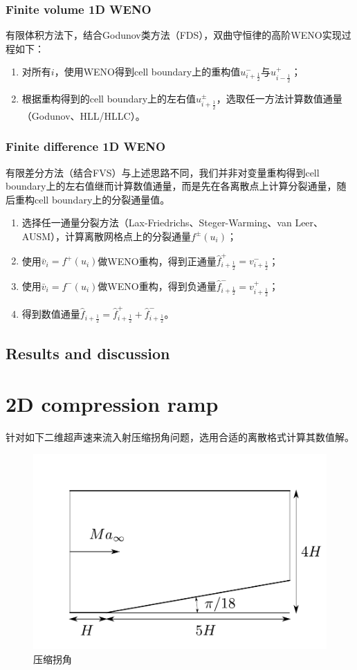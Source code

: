 \documentclass[11pt]{article}
\begin{document}
\subsubsection{Finite volume 1D WENO}
有限体积方法下，结合Godunov类方法（FDS），双曲守恒律的高阶WENO实现过程如下：
\begin{enumerate}
	\item 对所有$i$，使用WENO得到cell boundary上的重构值$u_{i+\frac{1}{2}}^-$与$u_{i-\frac{1}{2}}^+$；
	\item 根据重构得到的cell boundary上的左右值$u_{i+\frac{1}{2}}^\pm$，选取任一方法计算数值通量（Godunov、HLL/HLLC）。
\end{enumerate}

\subsubsection{Finite difference 1D WENO}
有限差分方法（结合FVS）与上述思路不同，我们并非对变量重构得到cell boundary上的左右值继而计算数值通量，而是先在各离散点上计算分裂通量，随后重构cell boundary上的分裂通量值。
\begin{enumerate}
	\item 选择任一通量分裂方法（Lax-Friedrichs、Steger-Warming、van Leer、AUSM），计算离散网格点上的分裂通量$f^\pm(u_i)$；
	\item 使用$\bar{v}_i=f^+(u_i)$做WENO重构，得到正通量$\hat{f}^+_{i+\frac{1}{2}}=v^-_{i+\frac{1}{2}}$；
	\item 使用$\bar{v}_i=f^-(u_i)$做WENO重构，得到负通量$\hat{f}^-_{i+\frac{1}{2}}=v^+_{i+\frac{1}{2}}$；
	\item 得到数值通量$\hat{f}_{i+\frac{1}{2}}=\hat{f}^+_{i+\frac{1}{2}}+\hat{f}^-_{i+\frac{1}{2}}$。
\end{enumerate}

\subsection{Results and discussion}

\newpage
\section{2D compression ramp}
针对如下二维超声速来流入射压缩拐角问题，选用合适的离散格式计算其数值解。
\begin{figure}[htbp]
	\centering
	\includegraphics[width=.5\linewidth]{figure/sketch/ramp.pdf}
	\caption{\label{fig:ramp}压缩拐角}
\end{figure}
\end{document}
